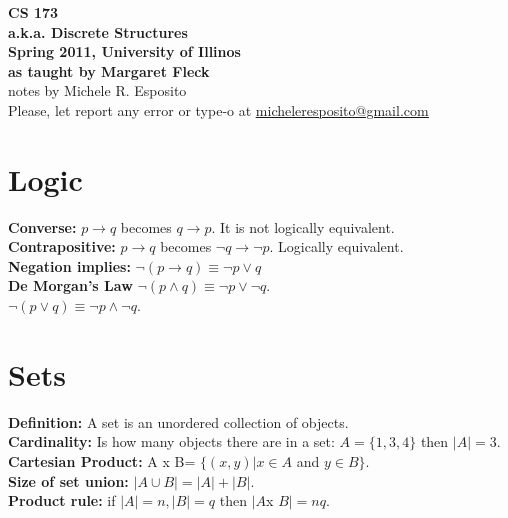 \documentclass[a4paper]{article}
\begin{document}
\begin{center}
{\bf{\huge CS 173 }}\\
{\bf{\huge a.k.a. Discrete Structures}}\\
\vspace{ 5 cm }
{\bf{\large Spring 2011, University of Illinos}}\\
{\bf{\large as taught by Margaret Fleck}}\\
\vspace{ 1 cm }                         
{\large notes by Michele R. Esposito}\\
\vspace{ 5cm }
Please, let report any error or type-o at \underline{\href{mailto:micheleresposito@gmail.com}{ micheleresposito@gmail.com }}

\end{center}

\newpage
\tableofcontents
\newpage
\section{Logic}
{\bf Converse:} $p \rightarrow q$ becomes $q \rightarrow p$. It is not logically equivalent.\\
{\bf Contrapositive:} $p \rightarrow q$ becomes $\neg q \rightarrow \neg p$. Logically equivalent.\\
{\bf Negation implies:} $\neg (p \rightarrow q) \equiv \neg p \vee q$\\
{\bf De Morgan's Law} $\neg (p \wedge q) \equiv \neg p \vee \neg q$.\\
$\neg (p \vee q) \equiv \neg p \wedge \neg q$.\\

\section{Sets}
{\bf Definition:} A set is an unordered collection of objects.\\
{\bf Cardinality:} Is how many objects there are in a set: $A=\{1,3,4\}$ then $|A|=3$.\\
{\bf Cartesian Product:} A x B= $\{(x,y)| x\in A$ and $y\in B\}$.\\
{\bf Size of set union:} $|A \cup B|= |A|+|B|$.\\
{\bf Product rule:} if $|A|=n, |B|=q$ then $|A $x $B|=nq$.\\
\end{document}
